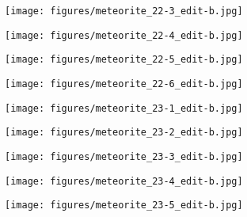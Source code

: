 \documentclass[a4paper, 11pt, oneside]{article}
\begin{document}
\clearpage
\begin{figure}[t]
\texttt{[image: figures/meteorite\_22-3\_edit-b.jpg]}
\caption{}
\centering
\end{figure}
\clearpage
\begin{figure}[t]
\texttt{[image: figures/meteorite\_22-4\_edit-b.jpg]}
\caption{}
\centering
\end{figure}
\clearpage
\begin{figure}[t]
\texttt{[image: figures/meteorite\_22-5\_edit-b.jpg]}
\caption{}
\centering
\end{figure}
\clearpage
\begin{figure}[t]
\texttt{[image: figures/meteorite\_22-6\_edit-b.jpg]}
\caption{}
\centering
\end{figure}
\clearpage
{}
\begin{figure}[t]
\texttt{[image: figures/meteorite\_23-1\_edit-b.jpg]}
\caption{}
\centering
\end{figure}
\clearpage
\begin{figure}[t]
\texttt{[image: figures/meteorite\_23-2\_edit-b.jpg]}
\caption{}
\centering
\end{figure}
\clearpage
\begin{figure}[t]
\texttt{[image: figures/meteorite\_23-3\_edit-b.jpg]}
\caption{}
\centering
\end{figure}
\clearpage
\begin{figure}[t]
\texttt{[image: figures/meteorite\_23-4\_edit-b.jpg]}
\caption{}
\centering
\end{figure}
\clearpage
\begin{figure}[t]
\texttt{[image: figures/meteorite\_23-5\_edit-b.jpg]}
\caption{}
\centering
\end{figure}
\end{document}

